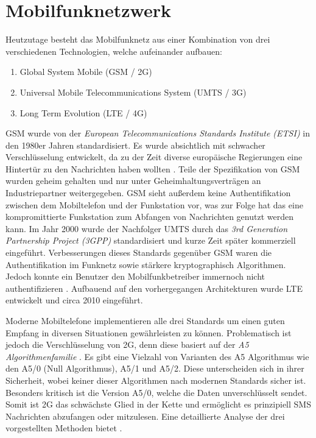 \documentclass[11pt,a4paper,ngerman]{scrreprt}
\begin{document}
\section{Mobilfunknetzwerk}
Heutzutage besteht das Mobilfunknetz aus einer Kombination von drei verschiedenen Technologien, welche aufeinander aufbauen:
\begin{enumerate}
    \item Global System Mobile (GSM / 2G)
    \item Universal Mobile Telecommunications System (UMTS / 3G)
    \item Long Term Evolution (LTE / 4G)
\end{enumerate}
GSM wurde von der \textit{European  Telecommunications  Standards  Institute (ETSI)} in den 1980er Jahren standardisiert. Es wurde absichtlich mit schwacher Verschlüsselung entwickelt, da zu der Zeit diverse europäische Regierungen eine Hintertür zu den Nachrichten haben wollten \cite{mobileSec}. Teile der Spezifikation von GSM wurden geheim gehalten und nur unter Geheimhaltungsverträgen an Industriepartner weitergegeben. GSM sieht außerdem keine Authentifikation zwischen dem Mobiltelefon und der Funkstation vor, was zur Folge hat das eine kompromittierte Funkstation zum Abfangen von Nachrichten genutzt werden kann. Im Jahr 2000 wurde der Nachfolger UMTS durch das \textit{3rd Generation Partnership Project (3GPP)} standardisiert und kurze Zeit später kommerziell eingeführt. Verbesserungen dieses Standards gegenüber GSM waren die Authentifikation im Funknetz sowie stärkere kryptographisch Algorithmen. Jedoch konnte ein Benutzer den Mobilfunkbetreiber immernoch nicht authentifizieren \cite{mobileSec}. Aufbauend auf den vorhergegangen Architekturen wurde LTE entwickelt und circa 2010 eingeführt.

Moderne Mobiltelefone implementieren alle drei Standards um einen guten Empfang in diversen Situationen gewährleisten zu können. Problematisch ist jedoch die Verschlüsselung von 2G, denn diese basiert auf der \emph{A5 Algorithmenfamilie} \cite{mobileSec}. Es gibt eine Vielzahl von Varianten des A5 Algorithmus wie den A5/0 (Null Algorithmus), A5/1 und A5/2. Diese unterscheiden sich in ihrer Sicherheit, wobei keiner dieser Algorithmen nach modernen Standards sicher ist. Besonders kritisch ist die Version A5/0, welche die Daten unverschlüsselt sendet. Somit ist 2G das schwächste Glied in der Kette und ermöglicht es prinzipiell SMS Nachrichten abzufangen oder mitzulesen. Eine detaillierte Analyse der drei vorgestellten Methoden bietet \cite{mobileSec}.
\end{document}
